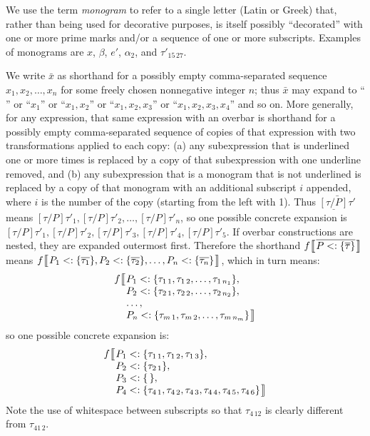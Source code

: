 We use the term \emph{monogram} to refer to a single letter (Latin or Greek)  that, rather than being used for decorative purposes, is itself possibly ``decorated'' with one or more prime marks and/or a sequence of one or more subscripts.  Examples of monograms are $x$, $\beta$, $e'$, $\alpha_2$, and $\tau'_{15\,27}$.

We write $\bar{x}$ as shorthand for a possibly empty comma-separated sequence $x_1, x_2, \ldots, x_n$ for some freely chosen nonnegative integer $n$;
thus $\bar{x}$ may expand to `` '' or ``$x_1$'' or ``$x_1, x_2$'' or ``$x_1, x_2, x_3$'' or ``$x_1, x_2, x_3, x_4$'' and so on.
More generally, for any expression, that same expression with an overbar is shorthand for a possibly empty comma-separated sequence
of copies of that expression with two transformations applied to each copy: (a) any subexpression that is underlined one or more times
is replaced by a copy of that subexpression with one underline removed, and (b) any subexpression that is a monogram that is not underlined
is replaced by a copy of that monogram with an additional subscript $i$ appended, where $i$ is the number of the copy (starting from the left with 1).
Thus $\bar{\underline{[\tau/P]}\tau'}$ means $[\tau/P]\tau'_1, [\tau/P]\tau'_2, \dots, [\tau/P]\tau'_n$,
so one possible concrete expansion is $[\tau/P]\tau'_1, [\tau/P]\tau'_2, [\tau/P]\tau'_3, [\tau/P]\tau'_4, [\tau/P]\tau'_5$.
If overbar constructions are nested, they are expanded outermost first.
Therefore the shorthand
$f\bigobb{P \extends \bdb{\tau}}$ means $f\bigob{P_1 \extends \bdb{\tau_1}, P_2 \extends \bdb{\tau_2}, \ldots, P_n \extends \bdb{\tau_n}}$, which in turn means:
\[ \begin{array}{l@{}l}
    f \big\llbracket \mskip0.5\thinmuskip & P_1 \extends \bd{\tau_{1\,1}, \tau_{1\,2}, \ldots, \tau_{1\,{n_1}}}, \\
                                          & P_2 \extends \bd{\tau_{2\,1}, \tau_{2\,2}, \ldots, \tau_{2\,{n_2}}}, \\
                                          & \ldots, \\
                                          & P_n \extends \bd{\tau_{m\,1}, \tau_{m\,2}, \ldots, \tau_{m\,{n_m}}} \mskip 0.5\thinmuskip \big\rrbracket
\end{array} \]
so one possible concrete expansion is:
\[ \begin{array}{l@{}l}
    f \big\llbracket \mskip0.5\thinmuskip & P_1 \extends \bd{\tau_{1\,1}, \tau_{1\,2}, \tau_{1\,3}}, \\
                                          & P_2 \extends \bd{\tau_{2\,1}}, \\
                                          & P_3 \extends \bd{\,}, \\
                                          & P_4 \extends \bd{\tau_{4\,1}, \tau_{4\,2}, \tau_{4\,3}, \tau_{4\,4}, \tau_{4\,5}, \tau_{4\,6}} \mskip 0.5\thinmuskip \big\rrbracket
\end{array} \]
Note the use of whitespace between subscripts so that $\tau_{4\,12}$ is clearly different from $\tau_{41\,2}$.

